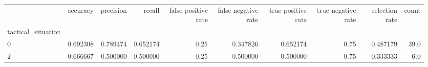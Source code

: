 \begin{tabular}{lrrrrrrrrr}
\toprule
{} &  accuracy &  precision &    recall &  false positive rate &  false negative rate &  true positive rate &  true negative rate &  selection rate &  count \\
tactical\_situation &           &            &           &                      &                      &                     &                     &                 &        \\
\midrule
0                  &  0.692308 &   0.789474 &  0.652174 &                 0.25 &             0.347826 &            0.652174 &                0.75 &        0.487179 &   39.0 \\
2                  &  0.666667 &   0.500000 &  0.500000 &                 0.25 &             0.500000 &            0.500000 &                0.75 &        0.333333 &    6.0 \\
\bottomrule
\end{tabular}
